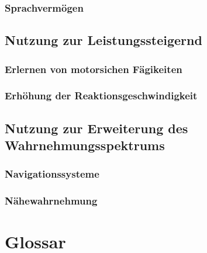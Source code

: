 \documentclass{llncs}					%
\begin{document}
\subsubsection{Sprachvermögen}
\subsection{Nutzung zur Leistungssteigernd}
\subsubsection{Erlernen von motorsichen Fägikeiten}
\subsubsection{Erhöhung der Reaktionsgeschwindigkeit}
\subsection{Nutzung zur Erweiterung des Wahrnehmungsspektrums}
\subsubsection{Navigationssysteme}
\subsubsection{Nähewahrnehmung}

\clearpage
\section{Glossar}\label{glossar}

\renewcommand*{\glossarysection}[2][]{}	%
\printnoidxglossaries				%

\clearpage

\end{document}
